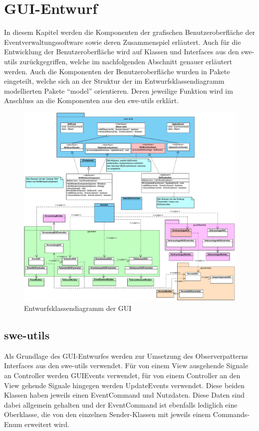 \chapter{GUI-Entwurf}
In diesem Kapitel werden die Komponenten der grafischen Benutzeroberfläche der Eventverwaltungssoftware sowie deren Zusammenspiel erläutert. Auch für die Entwicklung der Benutzeroberfläche wird auf Klassen und Interfaces aus den swe-utils zurückgegriffen, welche im nachfolgenden Abschnitt genauer erläutert werden. Auch die Komponenten der Benutzeroberfläche wurden in Pakete eingeteilt, welche sich an der Struktur der im Entwurfsklassendiagramm modellierten Pakete \enquote{model} orientieren. Deren jeweilige Funktion wird im Anschluss an die Komponenten aus den swe-utils erklärt.

\begin{figure}[ht!]
    \includegraphics[width=0.98\columnwidth]{Bilder/ekd_GUI.pdf}
    \caption{Entwurfsklassendiagramm der GUI}
\end{figure}

\section{swe-utils}
Als Grundlage des GUI-Entwurfes werden zur Umsetzung des Observerpatterns Interfaces aus den swe-utils verwendet. Für von einem View ausgehende Signale an Controller werden GUIEvents verwendet, für von einem Controller an den View gehende Signale hingegen werden UpdateEvents verwendet. Diese beiden Klassen haben jeweils einen EventCommand und Nutzdaten. Diese Daten sind dabei allgemein gehalten und der EventCommand ist ebenfalls lediglich eine Oberklasse, die von den einzelnen Sender-Klassen mit jeweils einem Commands-Enum erweitert wird.


